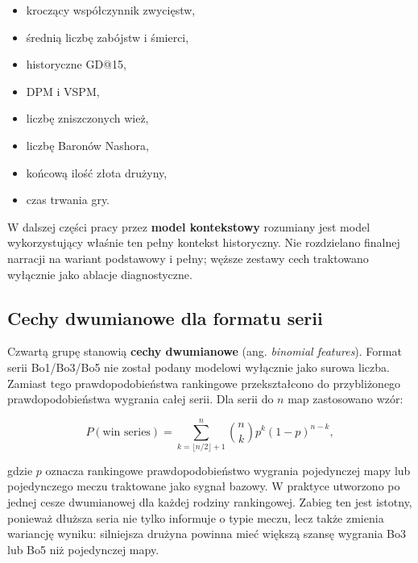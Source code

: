 \begin{itemize}
    \item kroczący współczynnik zwycięstw,
    \item średnią liczbę zabójstw i śmierci,
    \item historyczne GD@15,
    \item DPM i VSPM,
    \item liczbę zniszczonych wież,
    \item liczbę Baronów Nashora,
    \item końcową ilość złota drużyny,
    \item czas trwania gry.
\end{itemize}

W dalszej części pracy przez \textbf{model kontekstowy} rozumiany jest model wykorzystujący właśnie
ten pełny kontekst historyczny. Nie rozdzielano finalnej narracji na wariant podstawowy i pełny;
węższe zestawy cech traktowano wyłącznie jako ablacje diagnostyczne.

\subsection{Cechy dwumianowe dla formatu serii}

Czwartą grupę stanowią \textbf{cechy dwumianowe} (ang. \textit{binomial features}). Format serii
Bo1/Bo3/Bo5 nie został podany modelowi wyłącznie jako surowa liczba. Zamiast tego prawdopodobieństwa
rankingowe przekształcono do przybliżonego prawdopodobieństwa wygrania całej serii. Dla serii do $n$
map zastosowano wzór:

\[ P(\text{win series}) = \sum_{k=\lfloor n/2 \rfloor + 1}^{n} \binom{n}{k} p^k (1-p)^{n-k}, \]

gdzie $p$ oznacza rankingowe prawdopodobieństwo wygrania pojedynczej mapy lub pojedynczego meczu
traktowane jako sygnał bazowy. W praktyce utworzono po jednej cesze dwumianowej dla każdej rodziny
rankingowej. Zabieg ten jest istotny, ponieważ dłuższa seria nie tylko informuje o typie meczu, lecz
także zmienia wariancję wyniku: silniejsza drużyna powinna mieć większą szansę wygrania Bo3 lub Bo5
niż pojedynczej mapy.

